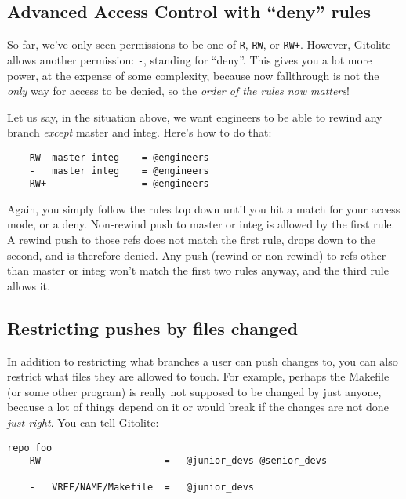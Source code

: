 \documentclass[a4paper]{book}
\begin{document}
\subsection{Advanced Access Control with “deny” rules}\label{advanced-access-control-with-deny-rules}

So far, we've only seen permissions to be one of \texttt{R}, \texttt{RW}, or \texttt{RW+}. However, Gitolite allows another permission: \texttt{-}, standing for “deny”. This gives you a lot more power, at the expense of some complexity, because now fallthrough is not the \emph{only} way for access to be denied, so the \emph{order of the rules now matters}!

Let us say, in the situation above, we want engineers to be able to rewind any branch \emph{except} master and integ. Here's how to do that:

\begin{shaded}\begin{verbatim}
    RW  master integ    = @engineers
    -   master integ    = @engineers
    RW+                 = @engineers
\end{verbatim}\end{shaded}

Again, you simply follow the rules top down until you hit a match for your access mode, or a deny. Non-rewind push to master or integ is allowed by the first rule. A rewind push to those refs does not match the first rule, drops down to the second, and is therefore denied. Any push (rewind or non-rewind) to refs other than master or integ won't match the first two rules anyway, and the third rule allows it.

\subsection{Restricting pushes by files changed}\label{restricting-pushes-by-files-changed}

In addition to restricting what branches a user can push changes to, you can also restrict what files they are allowed to touch. For example, perhaps the Makefile (or some other program) is really not supposed to be changed by just anyone, because a lot of things depend on it or would break if the changes are not done \emph{just right}. You can tell Gitolite:

\begin{shaded}\begin{verbatim}
repo foo
    RW                      =   @junior_devs @senior_devs

    -   VREF/NAME/Makefile  =   @junior_devs
\end{verbatim}\end{shaded}
\end{document}
